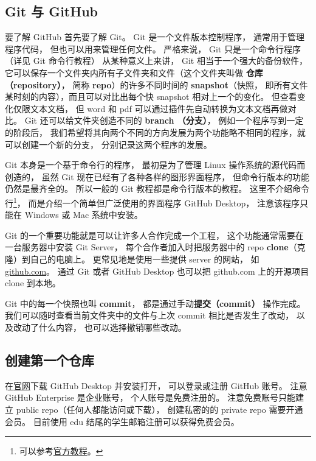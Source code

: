 

\begin{issues}
\issueTODO
\end{issues}

\subsection{Git 与 GitHub}
要了解 GitHub 首先要了解 Git。 Git 是一个文件版本控制程序， 通常用于管理程序代码， 但也可以用来管理任何文件。 严格来说， Git 只是一个命令行程序（详见 Git 命令行教程） 从某种意义上来讲， Git 相当于一个强大的备份软件， 它可以保存一个文件夹内所有子文件夹和文件（这个文件夹叫做 \textbf{仓库（repository）}， 简称 \textbf{repo}）的许多不同时间的 \textbf{snapshot}（快照， 即所有文件某时刻的内容），而且可以对比出每个快 snapshot 相对上一个的变化。 但查看变化仅限文本文档， 但 word 和 pdf 可以通过插件先自动转换为文本文档再做对比。 Git 还可以给文件夹创造不同的 \textbf{branch （分支）}， 例如一个程序写到一定的阶段后， 我们希望将其向两个不同的方向发展为两个功能略不相同的程序，就可以创建一个新的分支， 分别记录这两个程序的发展。

Git 本身是一个基于命令行的程序， 最初是为了管理 Linux 操作系统的源代码而创造的， 虽然 Git 现在已经有了各种各样的图形界面程序， 但命令行版本的功能仍然是最齐全的。 所以一般的 Git 教程都是命令行版本的教程。 这里不介绍命令行\footnote{可以参考\href{https://git-scm.com/book/en/v2}{官方教程}。}， 而是介绍一个简单但广泛使用的界面程序 GitHub Desktop， 注意该程序只能在 Windows 或 Mac 系统中安装。

Git 的一个重要功能就是可以让许多人合作完成一个工程， 这个功能通常需要在一台服务器中安装 Git Server， 每个合作者加入时把服务器中的 repo \textbf{clone}（克隆）到自己的电脑上。 更常见地是使用一些提供 server 的网站， 如 \href{https://github.com}{github.com}。 通过 Git 或者 GitHub Desktop 也可以把 github.com 上的开源项目 clone 到本地。

Git 中的每一个快照也叫 \textbf{commit}， 都是通过手动\textbf{提交（commit）} 操作完成。 我们可以随时查看当前文件夹中的文件与上次 commit 相比是否发生了改动， 以及改动了什么内容， 也可以选择撤销哪些改动。
 
\subsection{创建第一个仓库}
在\href{https://desktop.github.com/}{官网}下载 GitHub Desktop 并安装打开， 可以登录或注册 GitHub 账号。 注意 GitHub Enterprise 是企业账号， 个人账号是免费注册的。 注意免费账号只能建立 public repo（任何人都能访问或下载）， 创建私密的的 private repo 需要开通会员。 目前使用 edu 结尾的学生邮箱注册可以获得免费会员。

